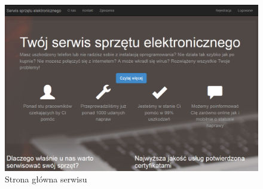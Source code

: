 \documentclass[a4paper,11pt]{article}
\begin{document}
\begin{figure}[H]
	\centering
	\includegraphics[width=\textwidth,height=0.55\textheight]{serwisGlowna.png}
	\caption{Strona główna serwisu}
\end{figure}
\end{document}
